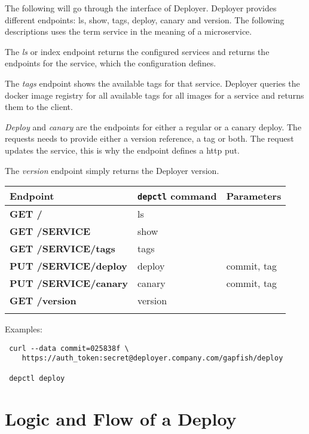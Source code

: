 The following will go through the interface of Deployer. Deployer provides different
endpoints: ls, show, tags, deploy, canary and version. The following descriptions uses the
term service in the meaning of a microservice.

The \emph{ls} or index endpoint returns the configured services and returns the endpoints
for the service, which the configuration defines.

The \emph{tags} endpoint shows the available tags for that service. Deployer queries the
docker image registry for all available tags for all images for a service and returns them
to the client.

\emph{Deploy} and \emph{canary} are the endpoints for either a regular or a canary
deploy. The requests needs to provide either a version reference, a tag or both. The
request updates the service, this is why the endpoint defines a http put.

The \emph{version} endpoint simply returns the Deployer version.

\begin{table}[!htbp]
  \begin{tabular}{ l|l|l }
    Endpoint & \texttt{depctl} command & Parameters \\
    \hline \hline
    \textbf{GET /} & ls & \\
    \textbf{GET /SERVICE} & show & \\
    \textbf{GET /SERVICE/tags} & tags & \\
    \textbf{PUT /SERVICE/deploy} & deploy & commit, tag \\
    \textbf{PUT /SERVICE/canary} & canary & commit, tag \\
    \textbf{GET /version} & version & \\
    \multicolumn{3}{l}{} %
  \end{tabular}

  Examples:

\begin{verbatim}
 curl --data commit=025838f \
    https://auth_token:secret@deployer.company.com/gapfish/deploy

 depctl deploy
\end{verbatim}
\end{table}

\section{Logic and Flow of a Deploy}

